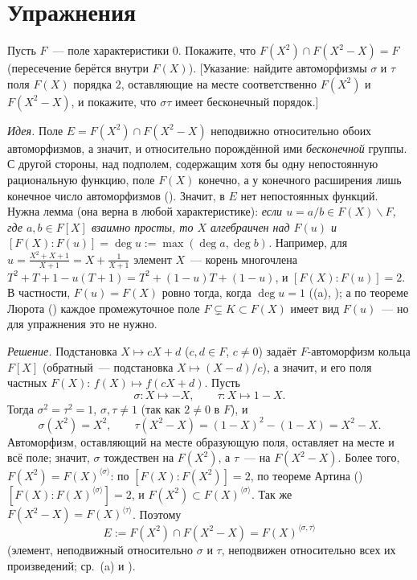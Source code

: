 \makeatletter
{}
\makeatother
\section*{Упражнения}

\begin{exercise}[3-1]
Пусть $F$~--- поле характеристики $0$. Покажите, что $F(X^2)\cap F(X^2-X)=F$ (пересечение берётся внутри $F(X)$).
[Указание: найдите автоморфизмы $\sigma$ и $\tau$ поля $F(X)$ порядка $2$, оставляющие на месте соответственно $F(X^2)$ и
$F(X^2-X)$, и покажите, что $\sigma\tau$ имеет бесконечный порядок.]
\end{exercise}

\noindent\emph{Идея.} Поле $E=F(X^2)\cap F(X^2-X)$ неподвижно относительно обоих автоморфизмов, а значит, и относительно
порождённой ими \emph{бесконечной} группы. С другой стороны, над подполем, содержащим хотя бы одну непостоянную
рациональную функцию, поле $F(X)$ конечно, а у конечного расширения лишь конечное число автоморфизмов ().
Значит, в $E$ нет непостоянных функций. Нужна лемма  (она верна в любой характеристике): \emph{если
$u=a/b\in F(X)\smallsetminus F$, где $a,b\in F[X]$ взаимно просты, то $X$ алгебраичен над $F(u)$ и
$[F(X):F(u)]=\deg u:=\max(\deg a,\deg b)$.} Например, для $u=\frac{X^2+X+1}{X+1}=X+\frac1{X+1}$ элемент $X$~--- корень
многочлена $T^2+T+1-u(T+1)=T^2+(1-u)T+(1-u)$, и $[F(X):F(u)]=2$. В частности, $F(u)=F(X)$ ровно тогда, когда $\deg u=1$
((a), ); а по теореме Люрота () каждое промежуточное поле $F\subsetneq K\subset F(X)$ имеет вид
$F(u)$~--- но для упражнения это не нужно.

\medskip\noindent\emph{Решение.} Подстановка $X\mapsto cX+d$ ($c,d\in F$, $c\ne0$) задаёт $F$-автоморфизм кольца $F[X]$ (обратный~---
подстановка $X\mapsto(X-d)/c$), а значит, и его поля частных $F(X)$: $f(X)\mapsto f(cX+d)$. Пусть
\[
\sigma\colon X\mapsto -X,\qquad \tau\colon X\mapsto 1-X .
\]
Тогда $\sigma^2=\tau^2=1$, $\sigma,\tau\ne1$ (так как $2\ne0$ в $F$), и
\[
\sigma(X^2)=X^2,\qquad \tau(X^2-X)=(1-X)^2-(1-X)=X^2-X .
\]
Автоморфизм, оставляющий на месте образующую поля, оставляет на месте и всё поле; значит, $\sigma$ тождествен на $F(X^2)$, а
$\tau$~--- на $F(X^2-X)$. Более того, $F(X^2)=F(X)^{\langle\sigma\rangle}$: по  $[F(X):F(X^2)]=2$, по теореме Артина
() $[F(X):F(X)^{\langle\sigma\rangle}]=2$, и $F(X^2)\subset F(X)^{\langle\sigma\rangle}$. Так же
$F(X^2-X)=F(X)^{\langle\tau\rangle}$. Поэтому
\[
E:=F(X^2)\cap F(X^2-X)=F(X)^{\langle\sigma,\tau\rangle}
\]
(элемент, неподвижный относительно $\sigma$ и $\tau$, неподвижен относительно всех их произведений; ср.\ (a) и
).

